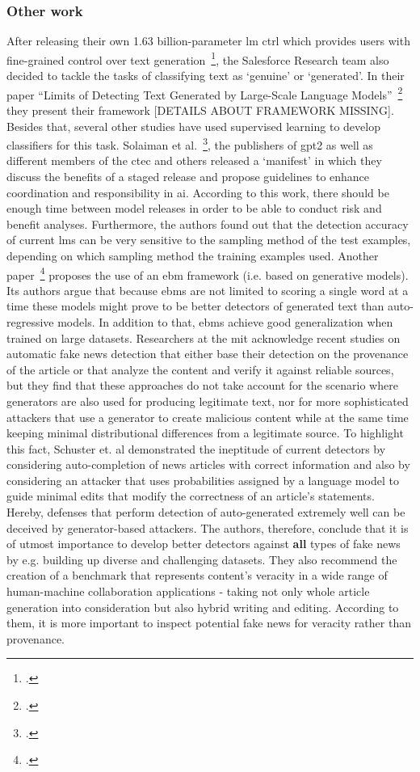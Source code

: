 \subsubsection{Other work}
\label{sub:other_work}

After releasing their own 1.63 billion-parameter \gls{lm} \gls{ctrl} which provides users with fine-grained control over text generation~\footcite{keskar2019ctrl}, the Salesforce Research team also decided to tackle the tasks of classifying text as `genuine' or `generated'. In their paper ``Limits of Detecting Text Generated by Large-Scale Language Models''~\footcite{varshney2020limits} they present their framework [DETAILS ABOUT FRAMEWORK MISSING]. Besides that, several other studies have used supervised learning to develop classifiers for this task.
Solaiman et al.~\footcite{solaiman2019release}, the publishers of \gls{gpt2} as well as different members of the \gls{ctec} and others released a `manifest' in which they discuss the benefits of a staged release and propose guidelines to enhance coordination and responsibility in \gls{ai}. According to this work, there should be enough time between model releases in order to be able to conduct risk and benefit analyses. Furthermore, the authors found out that the detection accuracy of current \gls{lm}s can be very sensitive to the sampling method of the test examples, depending on which sampling method the training examples used.
Another paper~\footcite{DBLP:journals/corr/abs-1906-03351} proposes the use of an \gls{ebm} framework (i.e. based on generative models). Its authors argue that because \gls{ebm}s are not limited to scoring a single word at a time these models might prove to be better detectors of generated text than auto-regressive models. In addition to that, \gls{ebm}s achieve good generalization when trained on large datasets.
Researchers at the \gls{mit} acknowledge recent studies on automatic fake news detection that either base their detection on the provenance of the article or that analyze the content and verify it against reliable sources, but they find that these approaches do not take account for the scenario where generators are also used for producing legitimate text, nor for more sophisticated attackers that use a generator to create malicious content while at the same time keeping minimal distributional differences from a legitimate source. To highlight this fact, Schuster et. al demonstrated the ineptitude of current detectors by considering auto-completion of news articles with correct information and also by considering an attacker that uses probabilities assigned by a language model to guide minimal edits that modify the correctness of an article's statements. Hereby, defenses that perform detection of auto-generated extremely well can be deceived by generator-based attackers. The authors, therefore, conclude that it is of utmost importance to develop better detectors against \textbf{all} types of fake news by e.g. building up diverse and challenging datasets. They also recommend the creation of a benchmark that represents content's veracity in a wide range of human-machine collaboration applications - taking not only whole article generation into consideration but also hybrid writing and editing. According to them, it is more important to inspect potential fake news for veracity rather than provenance.
